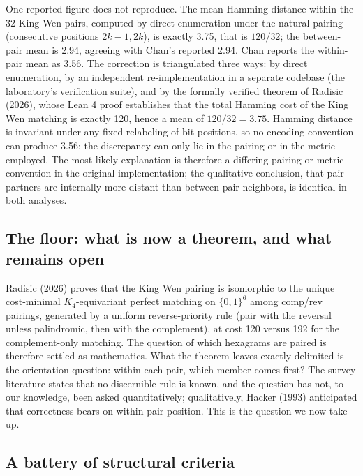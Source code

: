 \documentclass[11pt]{article}
\begin{document}
One reported figure does not reproduce. The mean Hamming distance within the 32 King Wen pairs, computed by direct enumeration under the natural pairing (consecutive positions $2k-1, 2k$), is exactly 3.75, that is $120/32$; the between-pair mean is 2.94, agreeing with Chan's reported 2.94. Chan reports the within-pair mean as 3.56. The correction is triangulated three ways: by direct enumeration, by an independent re-implementation in a separate codebase (the laboratory's verification suite), and by the formally verified theorem of Radisic (2026), whose Lean 4 proof establishes that the total Hamming cost of the King Wen matching is exactly 120, hence a mean of $120/32 = 3.75$. Hamming distance is invariant under any fixed relabeling of bit positions, so no encoding convention can produce 3.56: the discrepancy can only lie in the pairing or in the metric employed. The most likely explanation is therefore a differing pairing or metric convention in the original implementation; the qualitative conclusion, that pair partners are internally more distant than between-pair neighbors, is identical in both analyses.

\subsection{The floor: what is now a theorem, and what remains open}

Radisic (2026) proves that the King Wen pairing is isomorphic to the unique cost-minimal $K_4$-equivariant perfect matching on $\{0,1\}^6$ among comp/rev pairings, generated by a uniform reverse-priority rule (pair with the reversal unless palindromic, then with the complement), at cost 120 versus 192 for the complement-only matching. The question of which hexagrams are paired is therefore settled as mathematics. What the theorem leaves exactly delimited is the orientation question: within each pair, which member comes first? The survey literature states that no discernible rule is known, and the question has not, to our knowledge, been asked quantitatively; qualitatively, Hacker (1993) anticipated that correctness bears on within-pair position. This is the question we now take up.

\subsection{A battery of structural criteria}
\label{sec:battery}
\end{document}
